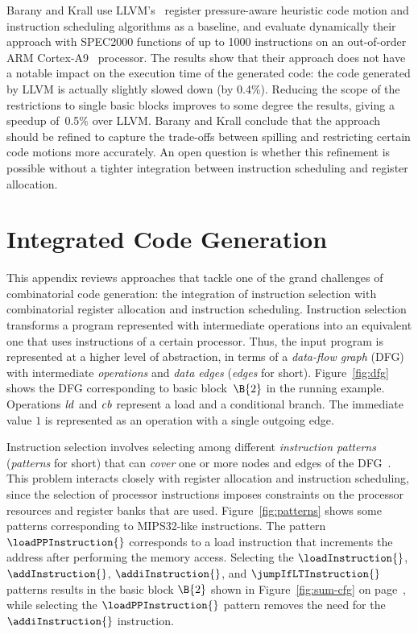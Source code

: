 \documentclass[acmsmall,authorversion,nonacm]{acmart}
\begin{document}
Barany and Krall use LLVM's~\cite{Lattner2004} register pressure-aware
heuristic code motion and instruction scheduling algorithms as a
baseline, and evaluate dynamically their approach with SPEC2000
functions of up to 1000 instructions on an out-of-order ARM
Cortex-A9~\cite{ARM} processor.
The results show that their approach does not have a notable impact on
the execution time of the generated code: the code generated by LLVM
is actually slightly slowed down (by 0.4\%).
Reducing the scope of the restrictions to single basic blocks improves
to some degree the results, giving a speedup of~0.5\% over LLVM.
Barany and Krall conclude that the approach should be refined to
capture the trade-offs between spilling and restricting certain code
motions more accurately.
An open question is whether this refinement is possible without a
tighter integration between instruction scheduling and register
allocation.

\section{Integrated Code Generation}\label{app:full-integration}

This appendix reviews approaches that tackle one of the grand
challenges of combinatorial code generation: the integration of
instruction selection with combinatorial register allocation and
instruction scheduling.
Instruction selection transforms a program represented with
intermediate operations into an equivalent one that uses instructions
of a certain processor.
Thus, the input program is represented at a higher level of
abstraction, in terms of a \emph{data-flow graph} (DFG) with
intermediate \emph{operations} and \emph{data edges} (\emph{edges} for
short).
Figure~\ref{fig:dfg} shows the DFG corresponding to basic
block~$\B{2}$ in the running example.
Operations $\textrm{\emph{ld}}$ and $\textrm{\emph{cb}}$ represent a
load and a conditional branch.
The immediate value $1$ is represented as an operation with a single
outgoing edge.

Instruction selection involves selecting among different
\emph{instruction patterns} (\emph{patterns} for short) that can
\emph{cover} one or more nodes and edges of the
DFG~\cite{HjortBlindell2016}.
This problem interacts closely with register allocation and
instruction scheduling, since the selection of processor instructions
imposes constraints on the processor resources and register banks that
are used.
Figure~\ref{fig:patterns} shows some patterns corresponding to
MIPS32-like instructions.
The pattern $\loadPPInstruction{}$ corresponds to a load instruction
that increments the address after performing the memory access.
Selecting the $\loadInstruction{}$, $\addInstruction{}$,
$\addiInstruction{}$, and $\jumpIfLTInstruction{}$ patterns results in
the basic block $\B{2}$ shown in Figure~\ref{fig:sum-cfg} on
page~\pageref{fig:sum-cfg}, while selecting the $\loadPPInstruction{}$
pattern removes the need for the $\addiInstruction{}$ instruction.
\end{document}
